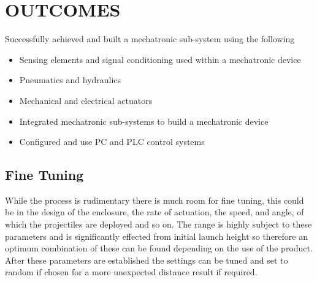\documentclass[a4paper, 10pt]{IEEEconf}
\begin{document}



\section{OUTCOMES}

Successfully achieved and built a mechatronic sub-system using the following

\begin{itemize}
	\item Sensing elements and signal conditioning used within a mechatronic device
	\item Pneumatics and hydraulics
	\item Mechanical and electrical actuators
	\item Integrated mechatronic sub-systems to build a mechatronic device
	\item Configured and use PC and PLC control systems
\end{itemize}


\subsection{Fine Tuning} 

While the process is rudimentary there is much room for fine tuning, this could be in the design of the enclosure, the rate of actuation, the speed, and angle, of which the projectiles are deployed and so on. The range is highly subject to these parameters and is significantly effected from initial launch height so therefore an optimum combination of these can be found depending on the use of the product. After these parameters are established the settings can be tuned and set to random if chosen for a more unexpected distance result if required.
\end{document}
